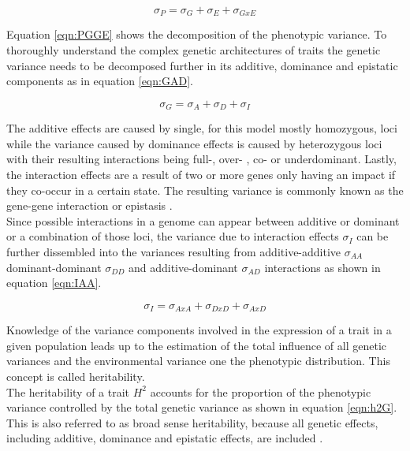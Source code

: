 \begin{equation}
 \sigma_{P} = \sigma_{G} + \sigma_{E} + \sigma_{GxE}
 \label{eqn:PGGE}
\end{equation}

Equation \ref{eqn:PGGE} shows the decomposition of the phenotypic variance. To thoroughly
understand the complex genetic architectures of traits the genetic variance needs to be
decomposed further in its additive, dominance and epistatic components as in equation
\ref{eqn:GAD}.

\begin{equation}
 \sigma_{G} = \sigma_{A} + \sigma_{D} + \sigma_{I}
 \label{eqn:GAD}
\end{equation}

The additive effects are caused by single, for this model mostly homozygous, loci while
the variance caused by dominance effects is caused by heterozygous loci with their
resulting interactions being full-, over- , co- or underdominant. Lastly, the interaction
effects are a result of two or more genes only having an impact if they co-occur in a
certain state. The resulting variance is commonly known as the gene-gene interaction or epistasis \cite{falconer1996}. \\
Since possible interactions in a genome can appear between additive or dominant or a
combination of those loci, the variance due to interaction effects $\sigma_{I}$ can be
further dissembled into the variances resulting from additive-additive $\sigma_{AA}$
dominant-dominant $\sigma_{DD}$ and additive-dominant $\sigma_{AD}$ interactions as shown
in equation \ref{eqn:IAA}.

\begin{equation}
 \sigma_{I} = \sigma_{AxA} + \sigma_{DxD} + \sigma_{AxD}
 \label{eqn:IAA}
\end{equation}

Knowledge of the variance components involved in the expression of a trait in a given
population leads up to the estimation of the total influence of all genetic variances and
the environmental variance one the phenotypic distribution. This concept is called
heritability. \\
The heritability of a trait $H^2$ accounts for the proportion of the phenotypic variance
controlled by the total genetic variance as shown in equation \ref{eqn:h2G}. This is also
referred to as broad sense heritability, because all genetic effects, including additive,
dominance and epistatic effects, are included \cite{brooker1999genetics}.

